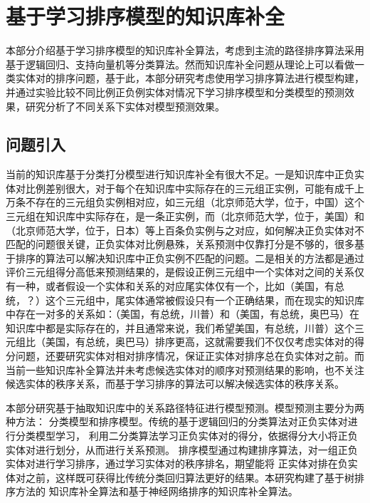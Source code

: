 

\chapter{基于学习排序模型的知识库补全}
\label{cha:kbc-rank}
本部分介绍基于学习排序模型的知识库补全算法，考虑到主流的路径排序算法采用基于逻辑回归、支持向量机等分类算法。然而知识库补全问题从理论上可以看做一类实体对的排序问题，基于此，本部分研究考虑使用学习排序算法进行模型构建，并通过实验比较不同比例正负例实体对情况下学习排序模型和分类模型的预测效果，研究分析了不同关系下实体对模型预测效果。
\section{问题引入}
当前的知识库基于分类打分模型进行知识库补全有很大不足。一是知识库中正负实体对比例差别很大，对于每个在知识库中实际存在的三元组正实例，可能有成千上万条不存在的三元组负实例相对应，如三元组（北京师范大学，位于，中国）这个三元组在知识库中实际存在，是一条正实例，而（北京师范大学，位于，美国）和（北京师范大学，位于，日本）等上百条负实例与之对应，如何解决正负实体对不匹配的问题很关键，正负实体对比例悬殊，关系预测中仅靠打分是不够的，很多基于排序的算法可以解决知识库中正负实例不匹配的问题。二是相关的方法都是通过评价三元组得分高低来预测结果的，是假设正例三元组中一个实体对之间的关系仅有一种，或者假设一个实体和关系的对应尾实体仅有一个，比如（美国，有总统，？）这个三元组中，尾实体通常被假设只有一个正确结果，而在现实的知识库中存在一对多的关系如：（美国，有总统，川普）和（美国，有总统，奥巴马）在知识库中都是实际存在的，并且通常来说，我们希望美国，有总统，川普）这个三元组比（美国，有总统，奥巴马）排序更高，这就需要我们不仅仅考虑实体对的得分问题，还要研究实体对相对排序情况，保证正实体对排序总在负实体对之前。而当前一些知识库补全算法并未考虑候选实体对的顺序对预测结果的影响，也不关注候选实体的秩序关系，而基于学习排序的算法可以解决候选实体的秩序关系。

本部分研究基于抽取知识库中的关系路径特征进行模型预测。模型预测主要分为两种方法：
分类模型和排序模型。传统的基于逻辑回归的分类算法对正负实体对进行分类模型学习，
利用二分类算法学习正负实体对的得分，依据得分大小将正负实体对进行划分，从而进行关系预测。
排序模型通过构建排序算法，对一组正负实体对进行学习排序，通过学习实体对的秩序排名，期望能将
正实体对排在负实体对之前，这样既可获得比传统分类回归算法更好的结果。本研究构建了基于树排序方法的
知识库补全算法和基于神经网络排序的知识库补全算法。

